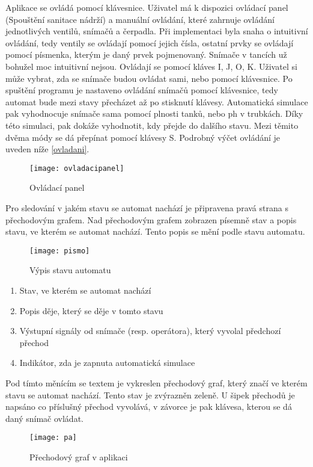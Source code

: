 \documentclass[12pt, a4paper]{article}
\begin{document}
Aplikace se ovládá pomocí klávesnice. Uživatel má k dispozici ovládací panel (Spouštění sanitace nádrží) a manuální ovládání, které zahrnuje ovládání jednotlivých ventilů, snímačů a čerpadla. Při implementaci byla snaha o intuitivní ovládání, tedy ventily se ovládají pomocí jejich čísla, ostatní prvky se ovládají pomocí písmenka, kterým je daný prvek pojmenovaný. Snímače v tancích už bohužel moc intuitivní nejsou. Ovládají se pomocí kláves I, J, O, K. Uživatel si může vybrat, zda se snímače budou ovládat sami, nebo pomocí klávesnice. Po spuštění programu je nastaveno ovládání snímačů pomocí klávesnice, tedy automat bude mezi stavy přecházet až po stisknutí klávesy. Automatická simulace pak vyhodnocuje snímače sama pomocí plnosti tanků, nebo ph v trubkách. Díky této simulaci, pak dokáže vyhodnotit, kdy přejde do dalšího stavu. Mezi těmito dvěma módy se dá přepínat pomocí klávesy S. Podrobný výčet ovládání je uveden níže \ref{ovladani}. 

\begin{figure}[h]
\centering 
\texttt{[image: ovladacipanel]}
\caption{Ovládací panel}
\end{figure}
\newpage

Pro sledování v jakém stavu se automat nachází je připravena pravá strana s přechodovým grafem. Nad přechodovým grafem zobrazen písemně stav a popis stavu, ve kterém se automat nachází. Tento popis se mění podle stavu automatu.

\begin{figure}[h]
\centering 
\texttt{[image: pismo]}
\caption{Výpis stavu automatu}
\end{figure}

\begin{enumerate}
  \item Stav, ve kterém se automat nachází
  \item Popis děje, který se děje v tomto stavu
  \item Výstupní signály od snímače (resp. operátora), který vyvolal předchozí přechod
  \item Indikátor, zda je zapnuta automatická simulace
\end{enumerate}

Pod tímto měnícím se textem je vykreslen přechodový graf, který značí ve kterém stavu se automat nachází. Tento stav je zvýrazněn zeleně. U šipek přechodů je napsáno co příslušný přechod vyvolává, v závorce je pak klávesa, kterou se dá daný snímač ovládat.

\begin{figure}[h]
\centering 
\texttt{[image: pa]}
\caption{Přechodový graf v aplikaci}
\end{figure}    
\end{document}
